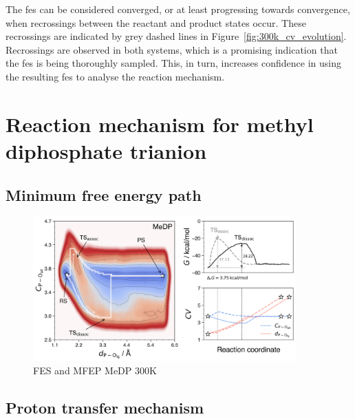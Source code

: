 The \ac{fes} can be considered converged, or at least progressing towards convergence, when recrossings between the reactant and product states occur. These recrossings are indicated by grey dashed lines in Figure~\ref{fig:300k_cv_evolution}. Recrossings are observed in both systems, which is a promising indication that the \ac{fes} is being thoroughly sampled. This, in turn, increases confidence in using the resulting \ac{fes} to analyse the reaction mechanism.


\section{Reaction mechanism for methyl diphosphate trianion}





\subsection{Minimum free energy path}

\begin{figure}[ht]
    \centering
    \includegraphics[width=0.9\textwidth]{Figures/4_Results/results_MeDP_300K_fes_mfep.png}
    \caption{FES and MFEP MeDP 300K}
    \label{fig:medp_300k_fes_mfep}
\end{figure}


\subsection{Proton transfer mechanism}



